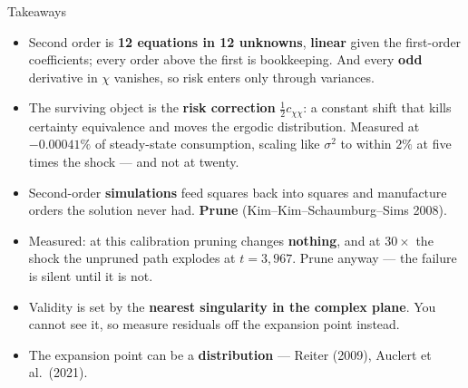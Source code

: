 \begin{frame}{Takeaways}
\begin{takeawaybox}
\begin{itemize}\small
  \item Second order is \textbf{12 equations in 12 unknowns}, \textbf{linear} given the first-order coefficients; every order above the first is bookkeeping. And every \textbf{odd} derivative in $\chi$ vanishes, so risk enters only through variances.
  \item The surviving object is the \textbf{risk correction} $\tfrac12 c_{\chi\chi}$: a constant shift that kills certainty equivalence and moves the ergodic distribution. Measured at $-0.00041\%$ of steady-state consumption, scaling like $\sigma^{2}$ to within $2\%$ at five times the shock --- and not at twenty.
  \item Second-order \textbf{simulations} feed squares back into squares and manufacture orders the solution never had. \textbf{Prune} (Kim--Kim--Schaumburg--Sims 2008).
  \item Measured: at this calibration pruning changes \textbf{nothing}, and at $30\times$ the shock the unpruned path explodes at $t=3{,}967$. Prune anyway --- the failure is silent until it is not.
  \item Validity is set by the \textbf{nearest singularity in the complex plane}. You cannot see it, so measure residuals off the expansion point instead.
  \item The expansion point can be a \textbf{distribution} --- Reiter (2009), Auclert et al.\ (2021).
\end{itemize}
\end{takeawaybox}
\end{frame}

